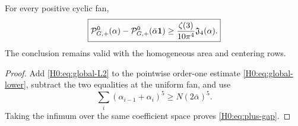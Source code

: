 \begin{corollary}\label{H0:cor:plus-gap}
For every positive cyclic fan,
\begin{equation}\label{H0:eq:plus-gap}
 \boxed{
 \mathcal P_{G,+}^0(\alpha)-\mathcal P_{G,+}^0(\bar\alpha\mathbf1)
 \ge\frac{\zeta(3)}{10\pi^4}\mathfrak J_4(\alpha).}
\end{equation}
The conclusion remains valid with the homogeneous area and centering rows.
\end{corollary}

\begin{proof}
Add \eqref{H0:eq:global-L2} to the pointwise order-one estimate
\eqref{H0:eq:global-lower}, subtract the two equalities at the uniform fan,
and use
\begin{equation}
 \sum_i(\alpha_{i-1}+\alpha_i)^5
 \ge N(2\bar\alpha)^5.
\end{equation}
Taking the infimum over the same coefficient space proves
\eqref{H0:eq:plus-gap}.
\end{proof}
\endgroup
